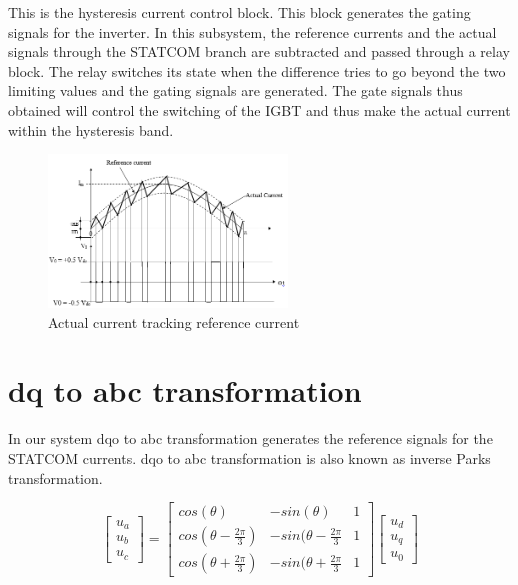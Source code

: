 \documentclass[journal,twoside]{IEEEtran}
\begin{document}
This is the hysteresis current control block. This
block generates the gating signals for the
inverter. In this subsystem, the reference
currents and the actual signals through the
STATCOM branch are subtracted and passed
through a relay block. The relay switches its state
when the difference tries to go beyond the two
limiting values and the gating signals are
generated. The gate signals thus obtained will
control the switching of the IGBT and thus make
the actual current within the hysteresis band.

\begin{figure}[!ht]
\includegraphics[width=2.5in]{7}
\caption{Actual current tracking reference current}
\label{f7}
\end{figure}

\section{dq to abc transformation}


In our system dqo to abc transformation
generates the reference signals for the
STATCOM currents. dqo to abc transformation is
also known as inverse Parks transformation.

\[
\begin{bmatrix}
u_a \\ u_b \\ u_c
\end{bmatrix}
=
  \begin{bmatrix}
    cos(\theta) & -sin(\theta) & 1\\cos(\theta-\frac{2\pi}{3}) & -sin(\theta-\frac{2\pi}{3} & 1\\ cos(\theta+\frac{2\pi}{3}) & -sin(\theta+\frac{2\pi}{3} & 1
  \end{bmatrix}
\begin{bmatrix}
u_d \\ u_q \\ u_0
\end{bmatrix}
\]

\end{document}
